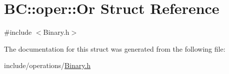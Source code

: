 \hypertarget{structBC_1_1oper_1_1Or}{}\section{BC\+:\+:oper\+:\+:Or Struct Reference}
\label{structBC_1_1oper_1_1Or}


{\ttfamily \#include $<$Binary.\+h$>$}



The documentation for this struct was generated from the following file\+:\begin{DoxyCompactItemize}
\item 
include/operations/\hyperlink{Binary_8h}{Binary.\+h}\end{DoxyCompactItemize}
